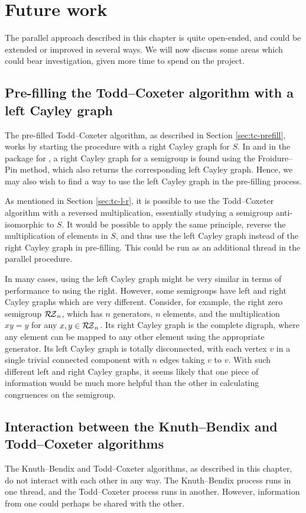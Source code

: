 \section{Future work}

The parallel approach described in this chapter is quite open-ended, and could
be extended or improved in several ways.  We will now discuss some areas which
could bear investigation, given more time to spend on the project.

\subsection{Pre-filling the Todd--Coxeter algorithm with a left Cayley graph}
\label{sec:prefill-left}
The pre-filled Todd--Coxeter algorithm, as described in Section
\ref{sec:tc-prefill}, works by starting the procedure with a right Cayley graph
for $S$.  In \libsemigroups{} and in the \Semigroups{} package for \GAP{}, a
right Cayley graph for a semigroup is found using the Froidure--Pin method, which
also returns the corresponding left Cayley graph.  Hence, we may also wish to
find a way to use the left Cayley graph in the pre-filling process.

As mentioned in Section \ref{sec:tc-l-r}, it is possible to use the Todd--Coxeter algorithm
with a reversed multiplication, essentially studying a semigroup anti-isomorphic
to $S$.  It would be possible to apply the same principle, reverse the
multiplication of elements in $S$, and thus use the left Cayley graph instead of
the right Cayley graph in pre-filling.  This could be run as an additional
thread in the parallel procedure.

In many cases, using the left Cayley graph might be very similar in terms of
performance to using the right.  However, some semigroups have left and right
Cayley graphs which are very different.  Consider, for example, the right zero
semigroup $\mathcal{R\!Z}_n$, which has $n$ generators, $n$ elements, and the
multiplication $xy=y$ for any $x,y \in \mathcal{R\!Z}_n$.  Its right Cayley graph is the
complete digraph, where any element can be mapped to any other element using the
appropriate generator.  Its left Cayley graph is totally disconnected, with each
vertex $v$ in a single trivial connected component with $n$ edges taking $v$ to
$v$.  With such different left and right Cayley graphs, it seems likely that one
piece of information would be much more helpful than the other in calculating
congruences on the semigroup.

\subsection{Interaction between the Knuth--Bendix and Todd--Coxeter algorithms}
\label{sec:linking-kb-tc}
The Knuth--Bendix and Todd--Coxeter algorithms, as described in this chapter, do
not interact with each other in any way.  The Knuth--Bendix process runs in one
thread, and the Todd--Coxeter process runs in another.  However, information from
one could perhaps be shared with the other.

